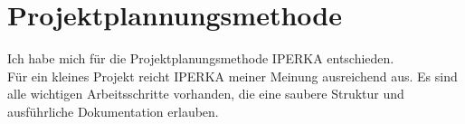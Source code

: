 \section{Projektplannungsmethode}
Ich habe mich für die Projektplanungsmethode IPERKA entschieden. \\
Für ein kleines Projekt reicht IPERKA meiner Meinung ausreichend aus. Es sind alle wichtigen Arbeitsschritte vorhanden, die eine saubere Struktur und ausführliche Dokumentation erlauben. 

\clearpage
